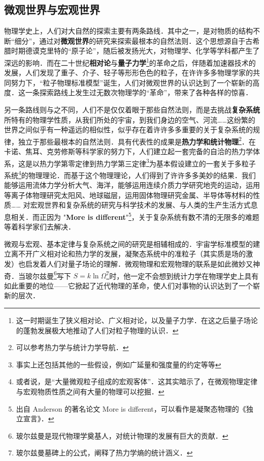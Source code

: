 \subsection{微观世界与宏观世界}
物理学史上，人们对大自然的探索主要有两条路线．其中之一，是对物质的结构不断“细分”，通过对\textbf{微观世界}的研究来探索最根本的自然法则．这个思想源自于古希腊时期德谟克里特的“原子论”，随后被发扬光大，对物理学、化学等学科都产生了深远的影响．而在二十世纪\textbf{相对论}与\textbf{量子力学}\footnote{这一时期诞生了狭义相对论、广义相对论，以及量子力学．在这之后量子场论的蓬勃发展极大地推动了人们对粒子物理的认识．}的革命之后，伴随着加速器技术的发展，人们发现了重子、介子、轻子等形形色色的粒子，在许许多多物理学家的共同努力下，“粒子物理标准模型”诞生，人们对微观世界的认识达到了一个崭新的高度．这一条探索路线上发生过无数次物理学的“革命”，带来了各种各样的惊喜．

另一条路线则与之不同，人们不是仅仅着眼于那些自然法则，而是去挑战\textbf{复杂系统}所特有的物理学性质，从我们所处的宇宙，到我们身边的空气、河流……这纷繁的世界之间似乎有一种遥远的相似性，似乎存在着许许多多重要的关于复杂系统的规律，独立于那些最根本的自然法则．具有代表性的成果是\textbf{热力学和统计物理}\footnote{可以参考热力学与统计力学导航．}．在卡诺、焦耳、克劳修斯等科学家的努力下，人们建立起一套完备的自洽的热力学体系，这是以热力学第零定律到热力学第三定律\footnote{事实上还包括其他的一些假设，例如广延量和强度量的约定等等}为基本假设建立的一套关于多粒子系统\footnote{或者说，是“大量微观粒子组成的宏观客体”．这其实暗示了，在微观物理定律与宏观物质性质之间有大量的物理可以挖掘．}的物理理论．而基于这个物理理论，人们得到了许许多多美妙的结果．我们能够运用流体力学分析大气、海洋，能够运用连续介质力学研究地壳的运动，运用等离子体物理研究太阳风、地球磁层，运用固体物理研究金属、半导体等材料的性质…… 对宏观世界和复杂系统的研究与科学技术的发展、与人类的生产生活方式息息相关．而正因为 "\textbf{More is different}"\footnote{出自 Anderson 的著名论文 More is different，可以看作是凝聚态物理的《独立宣言》．}，关于复杂系统有数不清的无限多的难题等着科学家们去解决．

微观与宏观、基本定律与复杂系统之间的研究是相辅相成的．宇宙学标准模型的建立离不开广义相对论和热力学的发展，凝聚态系统中的准粒子（其实质是场的激发）也启发着人们对量子场论的理解．微观物理和宏观物理的联系是如此微妙又神奇．当玻尔兹曼\footnote{玻尔兹曼是现代物理学奠基人，对统计物理的发展有巨大的贡献．}写下 $S=k\ln \Omega$\footnote{玻尔兹曼墓碑上的公式，阐释了热力学熵的统计涵义．}时，他一定不会想到统计力学在物理学史上具有如此重要的地位——它掀起了近代物理的革命，使人们对事物的认识达到了一个崭新的层次．
